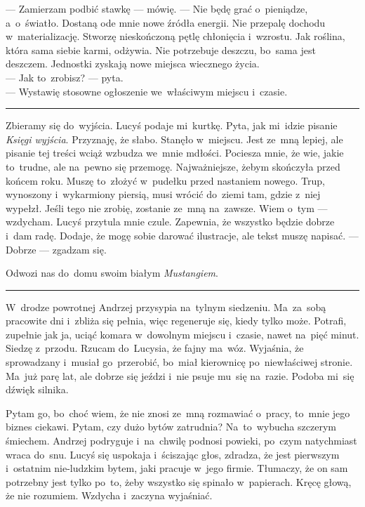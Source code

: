 \documentclass[9pt, a5paper]{memoir}
\begin{document}
--- Zamierzam podbić stawkę --- mówię. --- Nie będę grać o~pieniądze, a~o~światło. Dostaną ode mnie nowe źródła energii. Nie przepalę dochodu w~materializację. Stworzę nieskończoną pętlę chłonięcia i~wzrostu. Jak roślina, która sama siebie karmi, odżywia. Nie potrzebuje deszczu, bo~sama jest deszczem. Jednostki zyskają nowe miejsca wiecznego życia.\\
--- Jak to~zrobisz? --- pyta.\\
--- Wystawię stosowne ogłoszenie we~właściwym miejscu i~czasie.

\fancybreak{* \quad * \quad *}

Zbieramy się do~wyjścia. Lucyś podaje mi~kurtkę. Pyta, jak mi~idzie pisanie \textit{Księgi wyjścia}. Przyznaję, że słabo. Stanęło w~miejscu. Jest ze~mną lepiej, ale pisanie tej treści wciąż wzbudza we~mnie mdłości. Pociesza mnie, że wie, jakie to~trudne, ale na~pewno się przemogę. Najważniejsze, żebym skończyła przed końcem roku. Muszę to~złożyć w~pudełku przed nastaniem nowego. Trup, wynoszony i~wykarmiony piersią, musi wrócić do~ziemi tam, gdzie z~niej wypełzł. Jeśli tego nie zrobię, zostanie ze~mną na~zawsze. Wiem o~tym --- wzdycham. Lucyś przytula mnie czule. Zapewnia, że wszystko będzie dobrze i~dam radę. Dodaje, że mogę sobie darować ilustracje, ale tekst muszę napisać. --- Dobrze --- zgadzam się.

Odwozi nas do~domu swoim białym \textit{Mustangiem}.

\fancybreak{* \quad * \quad *}

W~drodze powrotnej Andrzej przysypia na~tylnym siedzeniu. Ma~za~sobą pracowite dni i~zbliża się pełnia, więc regeneruje się, kiedy tylko może. Potrafi, zupełnie jak ja, uciąć komara w~dowolnym miejscu i~czasie, nawet na~pięć minut. Siedzę z~przodu. Rzucam do~Lucysia, że fajny ma~wóz. Wyjaśnia, że sprowadzany i~musiał go~przerobić, bo~miał kierownicę po~niewłaściwej stronie. Ma~już parę lat, ale dobrze się jeździ i~nie psuje mu~się na~razie. Podoba mi~się dźwięk silnika.

Pytam go, bo~choć wiem, że nie znosi ze~mną rozmawiać o~pracy, to~mnie jego biznes ciekawi. Pytam, czy dużo bytów zatrudnia? Na~to~wybucha szczerym śmiechem. Andrzej podryguje i~na~chwilę podnosi powieki, po~czym natychmiast wraca do~snu. Lucyś się uspokaja i~ściszając głos, zdradza, że jest pierwszym i~ostatnim nie-ludzkim bytem, jaki pracuje w~jego firmie. Tłumaczy, że on sam potrzebny jest tylko po~to, żeby wszystko się spinało w~papierach. Kręcę głową, że nie rozumiem. Wzdycha i~zaczyna wyjaśniać.
\end{document}
